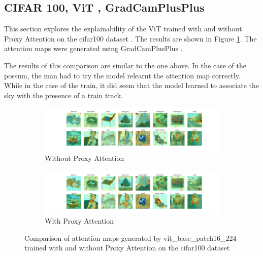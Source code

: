 \documentclass[a4paper,11pt,openright]{book}
\begin{document}
\subsection{CIFAR 100, ViT , GradCamPlusPlus}
This section explores the explainability of the ViT \cite{dosovitskiyImageWorth16x162021} trained with and without Proxy Attention on the cifar100 dataset \cite{krizhevskyLearningMultipleLayers}. The results are shown in Figure \ref{fig:vit_cifar100}. The attention maps were generated using GradCamPlusPlus \cite{chattopadhayGradCAMGeneralizedGradientBased2018}.

The results of this comparison are similar to the one above. In the case of the possum, the man had to try the model relearnt the attention map correctly. While in the case of the train, it did seem that the model learned to associate the sky with the presence of a train track. 

\begin{figure}[!htb]
        \begin{subfigure}[b]{1\textwidth}
            \includegraphics[width=\linewidth]{images/cifar100_vit_base_patch16_224_noproxy_0.pdf}
            \caption{Without Proxy Attention}
        \end{subfigure}
        \begin{subfigure}[b]{1\textwidth}
            \includegraphics[width=\linewidth]{images/cifar100_vit_base_patch16_224_proxy_0.pdf}
            \caption{With Proxy Attention}
        \end{subfigure}
        \caption{Comparison of attention maps generated by vit\_base\_patch16\_224 trained with and without Proxy Attention on the cifar100 dataset}
        \label{fig:vit_cifar100}
    \end{figure}
    
\end{document}
